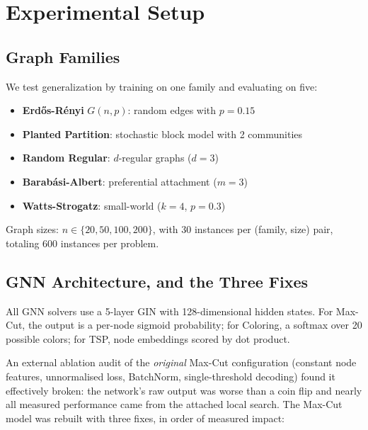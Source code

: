 \documentclass[11pt]{article}
\begin{document}
\section{Experimental Setup}

\subsection{Graph Families}

We test generalization by training on one family and evaluating on five:
\begin{itemize}
    \item \textbf{Erd\H{o}s-R\'enyi} $G(n, p)$: random edges with $p = 0.15$
    \item \textbf{Planted Partition}: stochastic block model with 2 communities
    \item \textbf{Random Regular}: $d$-regular graphs ($d = 3$)
    \item \textbf{Barab\'asi-Albert}: preferential attachment ($m = 3$)
    \item \textbf{Watts-Strogatz}: small-world ($k = 4$, $p = 0.3$)
\end{itemize}

Graph sizes: $n \in \{20, 50, 100, 200\}$, with 30 instances per (family, size) pair, totaling 600 instances per problem.

\subsection{GNN Architecture, and the Three Fixes}

All GNN solvers use a 5-layer GIN with 128-dimensional hidden states.
For Max-Cut, the output is a per-node sigmoid probability; for Coloring, a softmax over 20 possible colors; for TSP, node embeddings scored by dot product.

An external ablation audit of the \emph{original} Max-Cut configuration (constant node features, unnormalised loss, BatchNorm, single-threshold decoding) found it effectively broken: the network's raw output was worse than a coin flip and nearly all measured performance came from the attached local search. The Max-Cut model was rebuilt with three fixes, in order of measured impact:
\end{document}

